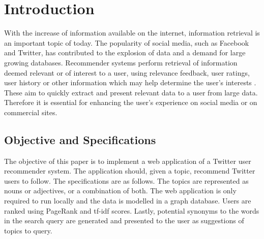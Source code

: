 \section{Introduction}
\label{sec:intro}

With the increase of information available on the internet, information
retrieval is an important topic of today. The popularity of social media, such
as Facebook and Twitter, has contributed to the explosion of data and a demand
for large growing databases. Recommender systems perform retrieval of
information deemed relevant or of interest to a user, using relevance feedback,
user ratings, user history or other information which may help determine the
user’s interests \citep{contBased}\cite{digLib}\cite{userRec}.  These aim to
quickly extract and present relevant data to a user from large data.  Therefore
it is essential for enhancing the user’s experience on social media or on
commercial sites.  

\subsection{Objective and Specifications}

The objective of this paper is to implement a web application of a Twitter user
recommender system. The application should, given a topic, recommend Twitter
users to follow. The specifications are as follows. The topics are represented
as nouns or adjectives, or a combination of both. The web application is only
required to run locally and the data is modelled in a graph database. Users are
ranked using PageRank and tf-idf scores. Lastly, potential synonyms to the words
in the search query are generated and presented to the user as suggestions of
topics to query.


